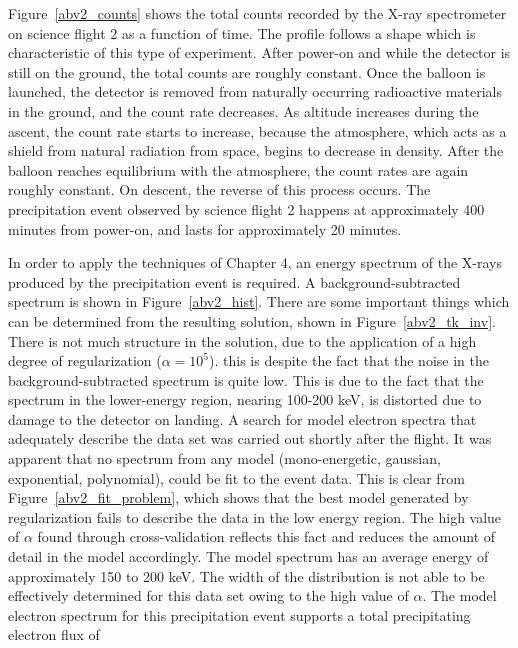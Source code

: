 Figure~\ref{abv2_counts} shows the total counts recorded by the X-ray spectrometer on science flight 2 as a function of time. The profile follows a shape which is characteristic of this type of experiment. After power-on and while the detector is still on the ground, the total counts are roughly constant. Once the balloon is launched, the detector is removed from naturally occurring radioactive materials in the ground, and the count rate decreases. As altitude increases during the ascent, the count rate starts to increase, because the atmosphere, which acts as a shield from natural radiation from space, begins to decrease in density. After the balloon reaches equilibrium with the atmosphere, the count rates are again roughly constant. On descent, the reverse of this process occurs. The precipitation event observed by science flight 2 happens at approximately 400 minutes from power-on, and lasts for approximately 20 minutes.

In order to apply the techniques of Chapter 4, an energy spectrum of the X-rays produced by the precipitation event is required. A background-subtracted spectrum is shown in Figure~\ref{abv2_hist}. There are some important things which can be determined from the resulting solution, shown in Figure~\ref{abv2_tk_inv}. There is not much structure in the solution, due to the application of a high degree of regularization ($\alpha = 10^5$). this is despite the fact that the noise in the background-subtracted spectrum is quite low. This is due to the fact that the spectrum in the lower-energy region, nearing 100-200 keV, is distorted due to damage to the detector on landing. A search for model electron spectra that adequately describe the data set was carried out shortly after the flight. It was apparent that no spectrum from any model (mono-energetic, gaussian, exponential, polynomial), could be fit to the event data. This is clear from 
Figure~\ref{abv2_fit_problem}, which shows that the best model generated by regularization fails to describe the data in the low energy region. The high value of $\alpha $ found through cross-validation reflects this fact and reduces the amount of detail in the model accordingly. The model spectrum has an average energy of approximately 150 to 200 keV. The width of the distribution is not able to be effectively determined for this data set owing to the high value of $\alpha$. The model electron spectrum for this precipitation event supports a total precipitating electron flux of 

